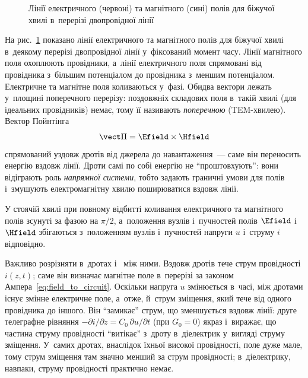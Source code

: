 \begin{figure}[h!]\centering
	\caption{Лінії електричного (червоні) та магнітного (сині) полів для біжучої хвилі в~перерізі двопровідної лінії\label{pic:EMWaveInLine}}
\end{figure}

На рис.~\ref{pic:EMWaveInLine} показано лінії електричного та магнітного полів для біжучої хвилі в~деякому перерізі двопровідної лінії у~фіксований момент часу. Лінії магнітного поля охоплюють провідники, а~лінії електричного поля спрямовані від провідника з~більшим потенціалом до провідника з~меншим потенціалом. Електричне та магнітне поля коливаються у~фазі. Обидва вектори лежать у~площині поперечного перерізу: поздовжніх складових поля в~такій хвилі (для ідеальних провідників) немає, тому її називають \emph{поперечною} (TEM-хвилею). Вектор Пойнтінга
\begin{equation*}
	\vect\Pi = \Efield \times \Hfield
\end{equation*}
спрямований уздовж дротів від джерела до навантаження~--- саме він переносить енергію вздовж лінії. Дроти самі по собі енергію не \enquote{проштовхують}: вони відіграють роль \emph{напрямної системи}, тобто задають граничні умови для полів і~змушують електромагнітну хвилю поширюватися вздовж лінії.

У стоячій хвилі при повному відбитті коливання електричного та магнітного полів зсунуті за фазою на $\pi/2$, а~положення вузлів і~пучностей полів $\Efield$ і~$\Hfield$ збігаються з~положенням вузлів і~пучностей напруги $u$ і~струму $i$ відповідно.

\begin{Attention}
	Важливо розрізняти  в~дротах і~ між ними. Вздовж дротів тече струм провідності $i(z,t)$; саме він визначає магнітне поле в~перерізі за законом Ампера~\eqref{eq:field_to_circuit}. Оскільки напруга $u$ змінюється в~часі, між дротами існує змінне електричне поле, а~отже, й~струм зміщення, який тече від одного провідника до іншого. Він \enquote{замикає} струм, що зменшується вздовж лінії: друге телеграфне рівняння $-\partial i/\partial z=C_0\,\partial u/\partial t$ (при $G_0=0$) якраз і~виражає, що частина струму провідності \enquote{витікає} з~дроту в~діелектрик у~вигляді струму зміщення. У~самих дротах, внаслідок їхньої високої провідності, поле дуже мале, тому струм зміщення там значно менший за струм провідності; в~діелектрику, навпаки, струму провідності практично немає.\end{Attention}

